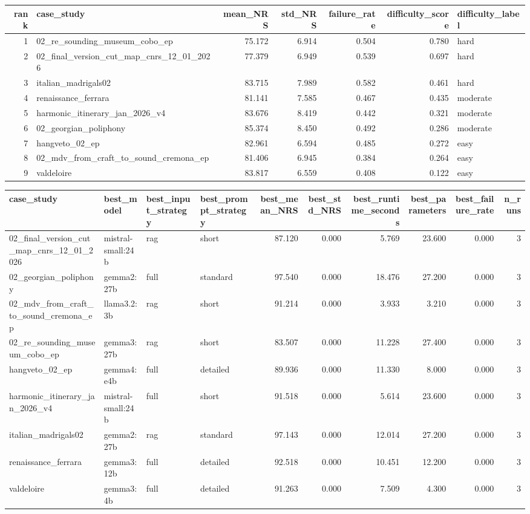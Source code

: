 \documentclass{article}
\begin{document}
\begin{tabular}{rlrrrrl}
\toprule
rank & case\_study & mean\_NRS & std\_NRS & failure\_rate & difficulty\_score & difficulty\_label \\
\midrule
1 & 02\_re\_sounding\_museum\_cobo\_ep & 75.172 & 6.914 & 0.504 & 0.780 & hard \\
2 & 02\_final\_version\_cut\_map\_cnrs\_12\_01\_2026 & 77.379 & 6.949 & 0.539 & 0.697 & hard \\
3 & italian\_madrigals02 & 83.715 & 7.989 & 0.582 & 0.461 & hard \\
4 & renaissance\_ferrara & 81.141 & 7.585 & 0.467 & 0.435 & moderate \\
5 & harmonic\_itinerary\_jan\_2026\_v4 & 83.676 & 8.419 & 0.442 & 0.321 & moderate \\
6 & 02\_georgian\_poliphony & 85.374 & 8.450 & 0.492 & 0.286 & moderate \\
7 & hangveto\_02\_ep & 82.961 & 6.594 & 0.485 & 0.272 & easy \\
8 & 02\_mdv\_from\_craft\_to\_sound\_cremona\_ep & 81.406 & 6.945 & 0.384 & 0.264 & easy \\
9 & valdeloire & 83.817 & 6.559 & 0.408 & 0.122 & easy \\
\bottomrule
\end{tabular}

\begin{tabular}{llllrrrrrr}
\toprule
case\_study & best\_model & best\_input\_strategy & best\_prompt\_strategy & best\_mean\_NRS & best\_std\_NRS & best\_runtime\_seconds & best\_parameters & best\_failure\_rate & n\_runs \\
\midrule
02\_final\_version\_cut\_map\_cnrs\_12\_01\_2026 & mistral-small:24b & rag & short & 87.120 & 0.000 & 5.769 & 23.600 & 0.000 & 3 \\
02\_georgian\_poliphony & gemma2:27b & full & standard & 97.540 & 0.000 & 18.476 & 27.200 & 0.000 & 3 \\
02\_mdv\_from\_craft\_to\_sound\_cremona\_ep & llama3.2:3b & rag & short & 91.214 & 0.000 & 3.933 & 3.210 & 0.000 & 3 \\
02\_re\_sounding\_museum\_cobo\_ep & gemma3:27b & rag & short & 83.507 & 0.000 & 11.228 & 27.400 & 0.000 & 3 \\
hangveto\_02\_ep & gemma4:e4b & full & detailed & 89.936 & 0.000 & 11.330 & 8.000 & 0.000 & 3 \\
harmonic\_itinerary\_jan\_2026\_v4 & mistral-small:24b & full & short & 91.518 & 0.000 & 5.614 & 23.600 & 0.000 & 3 \\
italian\_madrigals02 & gemma2:27b & rag & standard & 97.143 & 0.000 & 12.014 & 27.200 & 0.000 & 3 \\
renaissance\_ferrara & gemma3:12b & full & detailed & 92.518 & 0.000 & 10.451 & 12.200 & 0.000 & 3 \\
valdeloire & gemma3:4b & full & detailed & 91.263 & 0.000 & 7.509 & 4.300 & 0.000 & 3 \\
\bottomrule
\end{tabular}
\end{document}
